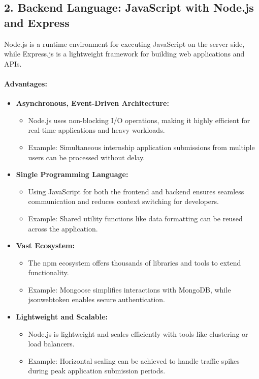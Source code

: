 \subsection*{2. Backend Language: JavaScript with Node.js and Express}
Node.js is a runtime environment for executing JavaScript on the server side, while Express.js is a lightweight framework for building web applications and APIs.

\paragraph{Advantages:}
\begin{itemize}
    \item \textbf{Asynchronous, Event-Driven Architecture:}
    \begin{itemize}
        \item Node.js uses non-blocking I/O operations, making it highly efficient for real-time applications and heavy workloads.
        \item Example: Simultaneous internship application submissions from multiple users can be processed without delay.
    \end{itemize}
    \item \textbf{Single Programming Language:}
    \begin{itemize}
        \item Using JavaScript for both the frontend and backend ensures seamless communication and reduces context switching for developers.
        \item Example: Shared utility functions like data formatting can be reused across the application.
    \end{itemize}
    \item \textbf{Vast Ecosystem:}
    \begin{itemize}
        \item The npm ecosystem offers thousands of libraries and tools to extend functionality.
        \item Example: Mongoose simplifies interactions with MongoDB, while jsonwebtoken enables secure authentication.
    \end{itemize}
    \item \textbf{Lightweight and Scalable:}
    \begin{itemize}
        \item Node.js is lightweight and scales efficiently with tools like clustering or load balancers.
        \item Example: Horizontal scaling can be achieved to handle traffic spikes during peak application submission periods.

\end{itemize}
\end{itemize}

